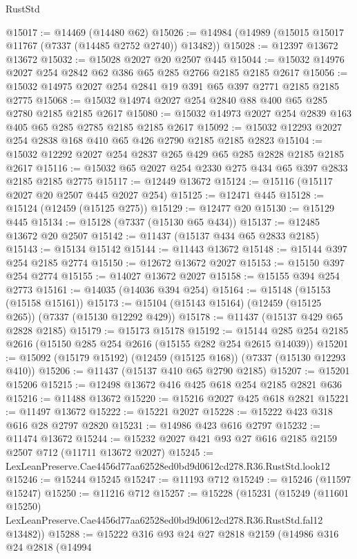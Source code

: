 \begin{lexlean}{RustStd}
\begin{coremodule}
@15017 := @14469 (@14480 @62)
@15026 := @14984 (@14989 (@15015 @15017 @11767 (@7337 (@14485 @2752 @2740)) @13482))
@15028 := @12397 @13672 @13672
@15032 := @15028 @2027 @20 @2507 @445
@15044 := @15032 @14976 @2027 @254 @2842 @62 @386 @65 @285 @2766 @2185 @2185 @2617
@15056 := @15032 @14975 @2027 @254 @2841 @19 @391 @65 @397 @2771 @2185 @2185 @2775
@15068 := @15032 @14974 @2027 @254 @2840 @88 @400 @65 @285 @2780 @2185 @2185 @2617
@15080 := @15032 @14973 @2027 @254 @2839 @163 @405 @65 @285 @2785 @2185 @2185 @2617
@15092 := @15032 @12293 @2027 @254 @2838 @168 @410 @65 @426 @2790 @2185 @2185 @2823
@15104 := @15032 @12292 @2027 @254 @2837 @265 @429 @65 @285 @2828 @2185 @2185 @2617
@15116 := @15032 @65 @2027 @254 @2330 @275 @434 @65 @397 @2833 @2185 @2185 @2775
@15117 := @12449 @13672
@15124 := @15116 (@15117 @2027 @20 @2507 @445 @2027 @254)
@15125 := @12471 @445
@15128 := @15124 (@12459 (@15125 @275))
@15129 := @12477 @20
@15130 := @15129 @445
@15134 := @15128 (@7337 (@15130 @65 @434))
@15137 := @12485 @13672 @20 @2507
@15142 := @11437 (@15137 @434 @65 @2833 @2185)
@15143 := @15134 @15142
@15144 := @11443 @13672
@15148 := @15144 @397 @254 @2185 @2774
@15150 := @12672 @13672 @2027
@15153 := @15150 @397 @254 @2774
@15155 := @14027 @13672 @2027
@15158 := @15155 @394 @254 @2773
@15161 := @14035 (@14036 @394 @254)
@15164 := @15148 (@15153 (@15158 @15161))
@15173 := @15104 (@15143 @15164) (@12459 (@15125 @265)) (@7337 (@15130 @12292 @429))
@15178 := @11437 (@15137 @429 @65 @2828 @2185)
@15179 := @15173 @15178
@15192 := @15144 @285 @254 @2185 @2616 (@15150 @285 @254 @2616 (@15155 @282 @254 @2615 @14039))
@15201 := @15092 (@15179 @15192) (@12459 (@15125 @168)) (@7337 (@15130 @12293 @410))
@15206 := @11437 (@15137 @410 @65 @2790 @2185)
@15207 := @15201 @15206
@15215 := @12498 @13672 @416 @425 @618 @254 @2185 @2821 @636
@15216 := @11488 @13672
@15220 := @15216 @2027 @425 @618 @2821
@15221 := @11497 @13672
@15222 := @15221 @2027
@15228 := @15222 @423 @318 @616 @28 @2797 @2820
@15231 := @14986 @423 @616 @2797
@15232 := @11474 @13672
@15244 := @15232 @2027 @421 @93 @27 @616 @2185 @2159 @2507 @712 (@11711 @13672 @2027)
@15245 := LexLeanPreserve.Cae4456d77aa62528ed0bd9d0612cd278.R36.RustStd.look12
@15246 := @15244 @15245
@15247 := @11193 @712
@15249 := @15246 (@11597 @15247)
@15250 := @11216 @712
@15257 := @15228
    (@15231
      (@15249
        (@11601 @15250)
        LexLeanPreserve.Cae4456d77aa62528ed0bd9d0612cd278.R36.RustStd.fal12
        @13482))
@15288 := @15222
    @316
    @93
    @24
    @27
    @2818
    @2159
    (@14986
      @316
      @24
      @2818
      (@14994

\end{coremodule}
\end{lexlean}
